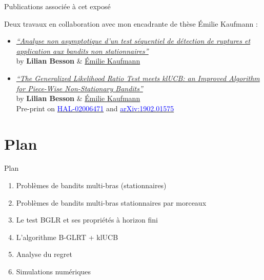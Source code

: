\documentclass[11pt,french,ignorenonframetext,]{beamer}
\begin{document}
\begin{frame}{Publications associée à cet exposé}

  Deux travaux en collaboration avec mon encadrante de thèse Émilie Kaufmann
  \dInnocey{} :

  \begin{itemize}
    \item
      \href{https://hal.inria.fr/hal-02006471/document}{\emph{``Analyse non asymptotique d'un test séquentiel de détection de ruptures et application aux bandits non stationnaires''}}\\
      by \textbf{Lilian Besson} \&
      \href{http://chercheurs.lille.inria.fr/ekaufman/research.html}{Émilie
      Kaufmann}

    \vspace*{30pt}

    \item
      \href{https://hal.inria.fr/hal-02006471/document}{\emph{``The Generalized Likelihood Ratio Test meets klUCB: an Improved Algorithm for Piece-Wise Non-Stationary Bandits''}}\\
      by \textbf{Lilian Besson} \&
      \href{http://chercheurs.lille.inria.fr/ekaufman/research.html}{Émilie
      Kaufmann}\\
      Pre-print on
      \href{https://hal.inria.fr/hal-02006471}{\textcolor{blue}{HAL-02006471}}
      and
      \href{https://arxiv.org/abs/1902.01575}{\textcolor{blue}{arXiv:1902.01575}}

  \end{itemize}

\end{frame}


\section{\hfill{}Plan\hfill{}}

\begin{frame}{Plan}

  \begin{enumerate}
    \item
      Problèmes de bandits multi-bras (stationnaires)
    \vspace*{15pt}

    \item
      Problèmes de bandits multi-bras stationnaires par morceaux
    \vspace*{15pt}

    \item
      Le test BGLR et ses propriétés à horizon fini
    \vspace*{15pt}

    \item
      L'algorithme B-GLRT + klUCB
    \vspace*{15pt}

    \item
      Analyse du regret
    \vspace*{15pt}

    \item
      Simulations numériques
  \end{enumerate}

\end{frame}
\end{document}

